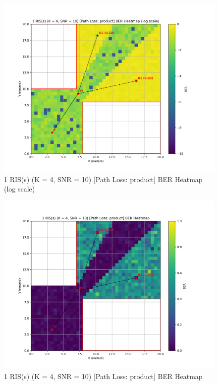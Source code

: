 \begin{figure}[H]
  \centering
  \includegraphics[width=0.8\linewidth]{imgs/heatmap-simulations/1 RIS(s) (K = 4, SNR = 10) [Path Loss_ product] BER Heatmap (log scale).png}
  \caption{1 RIS(s) (K = 4, SNR = 10) [Path Loss: product] BER Heatmap (log scale)}
\end{figure}

\begin{figure}[H]
  \centering
  \includegraphics[width=0.8\linewidth]{imgs/heatmap-simulations/1 RIS(s) (K = 4, SNR = 10) [Path Loss_ product] BER Heatmap.png}
  \caption{1 RIS(s) (K = 4, SNR = 10) [Path Loss: product] BER Heatmap}
\end{figure}

